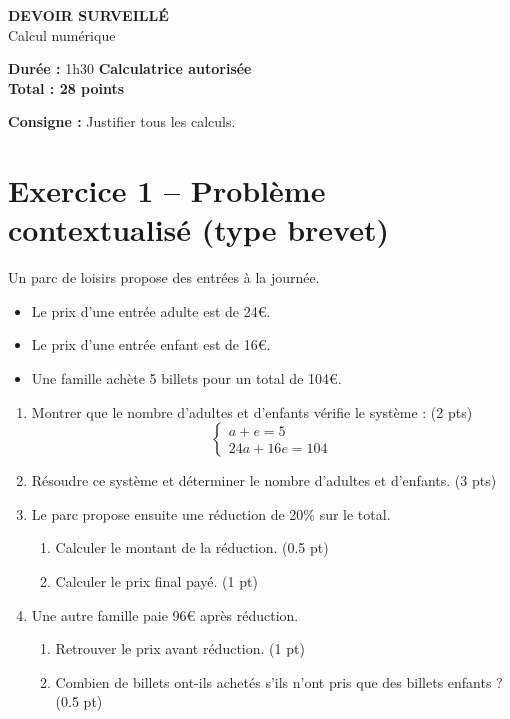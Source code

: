 \documentclass[11pt,a4paper]{article}
\begin{document}
\begin{center}
\Large \textbf{DEVOIR SURVEILLÉ}\\
\large Calcul numérique
\end{center}

\vspace{0.5cm}

\textbf{Durée :} 1h30 \hfill \textbf{Calculatrice autorisée}\\
\textbf{Total : 28 points}

\textbf{Consigne :} Justifier tous les calculs.

\vspace{0.5cm}

\section*{Exercice 1 -- Problème contextualisé (type brevet)}

Un parc de loisirs propose des entrées à la journée.

\begin{itemize}
\item Le prix d’une entrée adulte est de 24€.
\item Le prix d’une entrée enfant est de 16€.
\item Une famille achète 5 billets pour un total de 104€.
\end{itemize}

\begin{enumerate}
\item Montrer que le nombre d’adultes et d’enfants vérifie le système : \hfill (2 pts)
\[
\begin{cases}
a + e = 5 \\
24a + 16e = 104
\end{cases}
\]

\item Résoudre ce système et déterminer le nombre d’adultes et d’enfants. \hfill (3 pts)

\item Le parc propose ensuite une réduction de 20\% sur le total.
\begin{enumerate}
\item Calculer le montant de la réduction. \hfill (0.5 pt)
\item Calculer le prix final payé. \hfill (1 pt)
\end{enumerate}

\item Une autre famille paie 96€ après réduction.
\begin{enumerate}
\item Retrouver le prix avant réduction. \hfill (1 pt)
\item Combien de billets ont-ils achetés s’ils n’ont pris que des billets enfants ? \hfill (0.5 pt)
\end{enumerate}

\end{enumerate}
\end{document}
